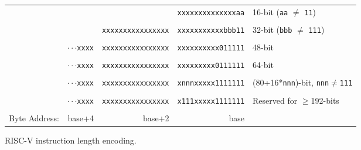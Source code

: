 \begin{figure}[hbt]
{
\begin{center}
\begin{tabular}{ccccl}
\cline{4-4}
& & & \multicolumn{1}{|c|}{\tt xxxxxxxxxxxxxxaa} & 16-bit ({\tt aa}
$\neq$ {\tt 11})\\
\cline{4-4}
\\
\cline{3-4}
& & \multicolumn{1}{|c|}{\tt xxxxxxxxxxxxxxxx}
& \multicolumn{1}{c|}{\tt xxxxxxxxxxxbbb11} & 32-bit ({\tt bbb}
$\neq$ {\tt 111}) \\
\cline{3-4}
\\
\cline{2-4}
\hspace{0.1in} 
& \multicolumn{1}{c|}{$\cdot\cdot\cdot${\tt xxxx} }
& \multicolumn{1}{c|}{\tt xxxxxxxxxxxxxxxx}
& \multicolumn{1}{c|}{\tt xxxxxxxxxx011111} & 48-bit \\
\cline{2-4}
\\
\cline{2-4}
\hspace{0.1in} 
& \multicolumn{1}{c|}{$\cdot\cdot\cdot${\tt xxxx} }
& \multicolumn{1}{c|}{\tt xxxxxxxxxxxxxxxx}
& \multicolumn{1}{c|}{\tt xxxxxxxxx0111111} & 64-bit \\
\cline{2-4}
\\
\cline{2-4}
\hspace{0.1in} 
& \multicolumn{1}{c|}{$\cdot\cdot\cdot${\tt xxxx} }
& \multicolumn{1}{c|}{\tt xxxxxxxxxxxxxxxx}
& \multicolumn{1}{c|}{\tt xnnnxxxxx1111111} & (80+16*{\tt nnn})-bit,
       {\tt nnn}$\neq${\tt 111} \\
\cline{2-4}
\\
\cline{2-4}
\hspace{0.1in} 
& \multicolumn{1}{c|}{$\cdot\cdot\cdot${\tt xxxx} }
& \multicolumn{1}{c|}{\tt xxxxxxxxxxxxxxxx}
& \multicolumn{1}{c|}{\tt x111xxxxx1111111} & Reserved for $\geq$192-bits \\
\cline{2-4}
\\
Byte Address: & \multicolumn{1}{r}{base+4} & \multicolumn{1}{r}{base+2} & \multicolumn{1}{r}{base} & \\
 \end{tabular}
\end{center}
}
\caption{RISC-V instruction length encoding.}
\label{instlengthcode}
\end{figure}

